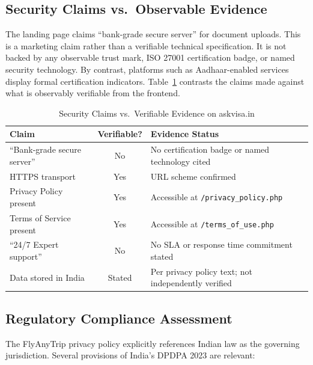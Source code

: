 \documentclass[journal, 10pt, twoside]{IEEEtran}
\begin{document}
\subsection{Security Claims vs.\ Observable Evidence}
The landing page claims ``bank-grade secure server'' for document uploads.
This is a marketing claim rather than a verifiable technical specification.
It is not backed by any observable trust mark, ISO 27001 certification
badge, or named security technology. By contrast, platforms such as
Aadhaar-enabled services display formal certification indicators.
Table~\ref{tab:security_claims} contrasts the claims made against what
is observably verifiable from the frontend.

\begin{table}[ht]
  \centering
  \caption{Security Claims vs.\ Verifiable Evidence on askvisa.in}
  \label{tab:security_claims}
  \begin{tabular}{@{}p{3.0cm} c p{3.0cm}@{}}
    \toprule
    \textbf{Claim} & \textbf{Verifiable?} & \textbf{Evidence Status} \\
    \midrule
    ``Bank-grade secure server'' & No  & No certification badge or
                                         named technology cited \\
    HTTPS transport              & Yes & URL scheme confirmed \\
    Privacy Policy present       & Yes & Accessible at
                                         \texttt{/privacy\_policy.php} \\
    Terms of Service present     & Yes & Accessible at
                                         \texttt{/terms\_of\_use.php} \\
    ``24/7 Expert support''      & No  & No SLA or response time
                                         commitment stated \\
    Data stored in India         & Stated & Per privacy policy text;
                                             not independently verified \\
    \bottomrule
  \end{tabular}
\end{table}

\subsection{Regulatory Compliance Assessment}
The FlyAnyTrip privacy policy explicitly references Indian law as the
governing jurisdiction. Several provisions of India's DPDPA 2023 are
relevant:
\end{document}
